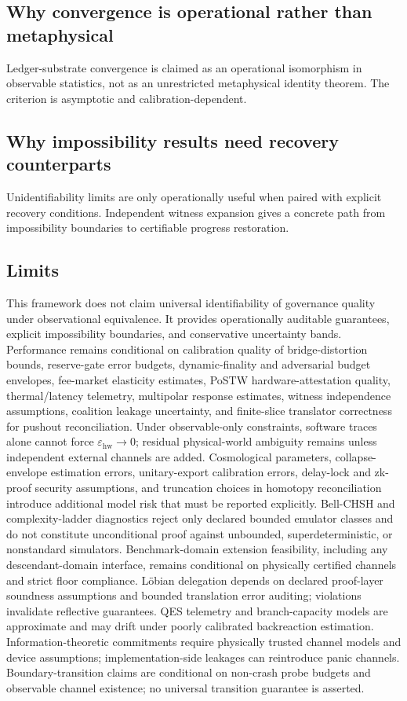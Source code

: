 \documentclass[11pt,a4paper]{article}
\newcommand{\eps}{\varepsilon}
\theoremstyle{definition}
\theoremstyle{remark}
\begin{document}
\subsection{Why convergence is operational rather than metaphysical}
Ledger-substrate convergence is claimed as an operational isomorphism in observable statistics, not as an unrestricted metaphysical identity theorem.
The criterion is asymptotic and calibration-dependent.

\subsection{Why impossibility results need recovery counterparts}
Unidentifiability limits are only operationally useful when paired with explicit recovery conditions.
Independent witness expansion gives a concrete path from impossibility boundaries to certifiable progress restoration.

\subsection{Limits}
This framework does not claim universal identifiability of governance quality under observational equivalence.
It provides operationally auditable guarantees, explicit impossibility boundaries, and conservative uncertainty bands.
Performance remains conditional on calibration quality of bridge-distortion bounds, reserve-gate error budgets, dynamic-finality and adversarial budget envelopes, fee-market elasticity estimates, PoSTW hardware-attestation quality, thermal/latency telemetry, multipolar response estimates, witness independence assumptions, coalition leakage uncertainty, and finite-slice translator correctness for pushout reconciliation.
Under observable-only constraints, software traces alone cannot force $\eps_{\mathrm{hw}}\to 0$; residual physical-world ambiguity remains unless independent external channels are added.
Cosmological parameters, collapse-envelope estimation errors, unitary-export calibration errors, delay-lock and zk-proof security assumptions, and truncation choices in homotopy reconciliation introduce additional model risk that must be reported explicitly.
Bell-CHSH and complexity-ladder diagnostics reject only declared bounded emulator classes and do not constitute unconditional proof against unbounded, superdeterministic, or nonstandard simulators.
Benchmark-domain extension feasibility, including any descendant-domain interface, remains conditional on physically certified channels and strict floor compliance.
L\"obian delegation depends on declared proof-layer soundness assumptions and bounded translation error auditing; violations invalidate reflective guarantees.
QES telemetry and branch-capacity models are approximate and may drift under poorly calibrated backreaction estimation.
Information-theoretic commitments require physically trusted channel models and device assumptions; implementation-side leakages can reintroduce panic channels.
Boundary-transition claims are conditional on non-crash probe budgets and observable channel existence; no universal transition guarantee is asserted.
\end{document}
